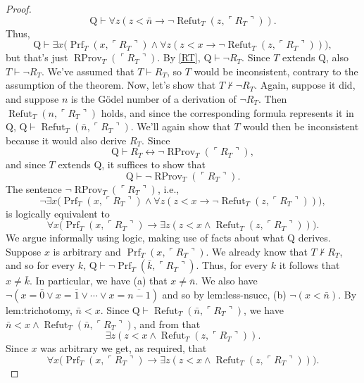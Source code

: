 \documentclass[UTF8,11pt]{ctexart}
\theoremstyle{definition}
\begin{document}
\begin{proof}
\[\mathrm Q\vdash\forall z(z<\bar n\to\neg\operatorname{Refut}_T(z,\ulcorner R_T\urcorner)).\]
Thus,
\[\mathrm Q\vdash\exists x\bigl(\operatorname{Prf}_T(x,\ulcorner R_T\urcorner)\land\forall z(z<x\to\neg\operatorname{Refut}_T(z,\ulcorner R_T\urcorner))\bigr),\]
but that's just $\operatorname{RProv}_T(\ulcorner R_T\urcorner)$. By \eqref{RT}, $\mathrm Q\vdash\neg R_T$. Since $T$ extends $\mathrm Q$, also $T\vdash\neg R_T$. We've assumed that $T\vdash R_T$, so $T$ would be inconsistent, contrary to the assumption of the theorem.
Now, let's show that $T\nvdash\neg R_T$. Again, suppose it did, and suppose $n$ is the G\"odel number of a derivation of $\neg R_T$. Then $\operatorname{Refut}_T(n,\ulcorner R_T\urcorner)$ holds, and since the corresponding formula represents it in $\mathrm Q$, $\mathrm Q\vdash\operatorname{Refut}_T(\bar n,\ulcorner R_T\urcorner)$. We'll again show that $T$ would then be inconsistent because it would also derive $R_T$. Since
\[\mathrm Q\vdash R_T\leftrightarrow\neg\operatorname{RProv}_T(\ulcorner R_T\urcorner),\]
and since $T$ extends $\mathrm Q$, it suffices to show that
\[\mathrm Q\vdash\neg\operatorname{RProv}_T(\ulcorner R_T\urcorner).\]
The sentence $\neg\operatorname{RProv}_T(\ulcorner R_T\urcorner)$, i.e.,
\[\neg\exists x\bigl(\operatorname{Prf}_T(x,\ulcorner R_T\urcorner)\land\forall z(z<x\to\neg\operatorname{Refut}_T(z,\ulcorner R_T\urcorner))\bigr),\]
is logically equivalent to
\[\forall x\bigl(\operatorname{Prf}_T(x,\ulcorner R_T\urcorner)\to\exists z(z<x\land\operatorname{Refut}_T(z,\ulcorner R_T\urcorner))\bigr).\]
We argue informally using logic, making use of facts about what $\mathrm Q$ derives. Suppose $x$ is arbitrary and $\operatorname{Prf}_T(x,\ulcorner R_T\urcorner)$. We already know that $T\nvdash R_T$, and so for every $k$, $\mathrm Q\vdash\neg\operatorname{Prf}_T(\bar k,\ulcorner R_T\urcorner)$. Thus, for every $k$ it follows that $x\ne\bar k$. In particular, we have (a) that $x\ne\bar n$. We also have $\neg(x=\bar0\lor x=\bar1\lor\cdots\lor x=\overline{n-1})$ and so by \textsf{lem:less-nsucc}, (b) $\neg(x<\bar n)$. By \textsf{lem:trichotomy}, $\bar n<x$. Since $\mathrm Q\vdash\operatorname{Refut}_T(\bar n,\ulcorner R_T\urcorner)$, we have $\bar n<x\land\operatorname{Refut}_T(\bar n,\ulcorner R_T\urcorner)$, and from that
\[\exists z(z<x\land\operatorname{Refut}_T(z,\ulcorner R_T\urcorner)).\]
Since $x$ was arbitrary we get, as required, that
\[\forall x\bigl(\operatorname{Prf}_T(x,\ulcorner R_T\urcorner)\to\exists z(z<x\land\operatorname{Refut}_T(z,\ulcorner R_T\urcorner))\bigr).\]
\end{proof}
\end{document}
